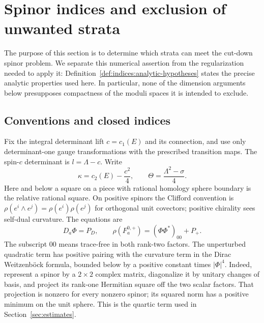 \section{Spinor indices and exclusion of unwanted strata}\label{sec:indices}

The purpose of this section is to determine which strata can meet the
cut-down spinor problem.  We separate this numerical assertion from the
regularization needed to apply it: Definition~\ref{def:indices:analytic-hypotheses}
states the precise analytic properties used here.
In particular, none of the dimension arguments below presupposes compactness
of the moduli spaces it is intended to exclude.

\subsection{Conventions and closed indices}

Fix the integral determinant lift $c=c_1(E)$ and its connection, and use only
determinant-one gauge transformations with the prescribed transition maps.
The spin-$c$ determinant is $l=\Lambda-c$.  Write
\begin{equation}\label{eq:indices:charge}
 \kappa=c_2(E)-\frac{c^2}{4},\qquad
 \Theta=\frac{\Lambda^2-\sigma}{4}.
\end{equation}
Here and below a square on a piece with rational homology sphere boundary is
the relative rational square.  On positive spinors the Clifford convention is
$\rho(e^i\wedge e^j)=\rho(e^i)\rho(e^j)$ for orthogonal unit covectors;
positive chirality sees self-dual curvature.  The equations are
\begin{equation}\label{eq:indices:equations}
 D_a\Phi=P_D,\qquad
 \rho(F_a^{0,+})=(\Phi\Phi^*)_{00}+P_+.
\end{equation}
The subscript $00$ means trace-free in both rank-two factors.  The unperturbed
quadratic term has positive pairing with the curvature term in the Dirac
Weitzenb\"ock formula, bounded below by a positive constant times $|\Phi|^4$.
Indeed, represent a spinor by a $2\times2$ complex matrix, diagonalize it by
unitary changes of basis, and project its rank-one Hermitian square off the
two scalar factors.  That projection is nonzero for every nonzero spinor;
its squared norm has a positive minimum on the unit sphere.  This is the
quartic term used in Section~\ref{sec:estimates}.

